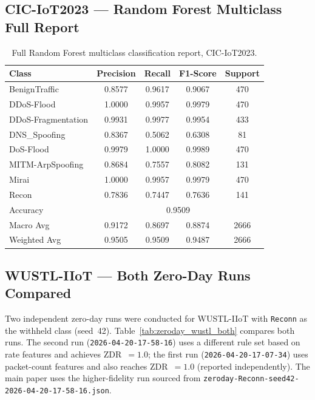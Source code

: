 \subsection{CIC-IoT2023 — Random Forest Multiclass Full Report}

\begin{table}[htbp]
\centering
\caption{Full Random Forest multiclass classification report, CIC-IoT2023.}
\label{tab:app_cic_rf_full}
\begin{tabular}{lcccc}
\toprule
\textbf{Class} & \textbf{Precision} & \textbf{Recall} & \textbf{F1-Score} & \textbf{Support} \\
\midrule
BenignTraffic      & 0.8577 & 0.9617 & 0.9067 & 470 \\
DDoS-Flood         & 1.0000 & 0.9957 & 0.9979 & 470 \\
DDoS-Fragmentation & 0.9931 & 0.9977 & 0.9954 & 433 \\
DNS\_Spoofing      & 0.8367 & 0.5062 & 0.6308 &  81 \\
DoS-Flood          & 0.9979 & 1.0000 & 0.9989 & 470 \\
MITM-ArpSpoofing   & 0.8684 & 0.7557 & 0.8082 & 131 \\
Mirai              & 1.0000 & 0.9957 & 0.9979 & 470 \\
Recon              & 0.7836 & 0.7447 & 0.7636 & 141 \\
\midrule
Accuracy           & \multicolumn{4}{c}{0.9509} \\
Macro Avg          & 0.9172 & 0.8697 & 0.8874 & 2666 \\
Weighted Avg       & 0.9505 & 0.9509 & 0.9487 & 2666 \\
\bottomrule
\end{tabular}
\end{table}

\subsection{WUSTL-IIoT — Both Zero-Day Runs Compared}\label{app:wustl_zeroday}

Two independent zero-day runs were conducted for WUSTL-IIoT with
\texttt{Reconn} as the withheld class (seed~42). Table~\ref{tab:zeroday_wustl_both}
compares both runs. The second run (\texttt{2026-04-20-17-58-16}) uses a
different rule set based on rate features and achieves ZDR~$= 1.0$; the first
run (\texttt{2026-04-20-17-07-34}) uses packet-count features and also reaches
ZDR~$= 1.0$ (reported independently). The main paper uses the higher-fidelity
run sourced from \texttt{zeroday-Reconn-seed42-2026-04-20-17-58-16.json}.

